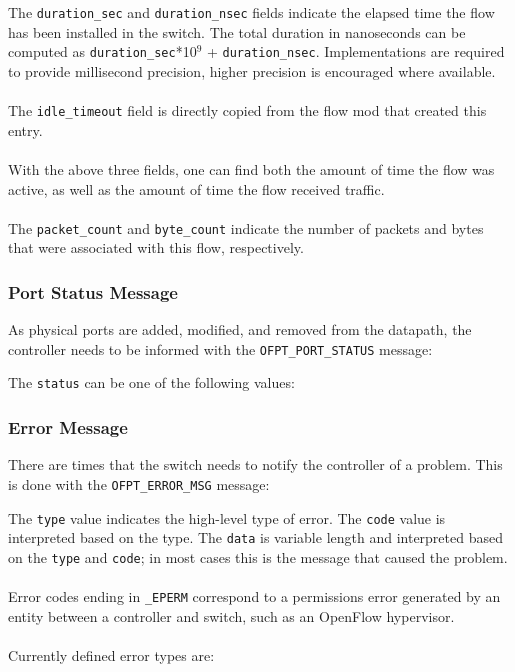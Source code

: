 
The \verb|duration_sec| and \verb|duration_nsec| fields indicate the elapsed time the flow has been installed in the switch. The total duration in nanoseconds can be computed as \verb|duration_sec|*10$^{9}$ + \verb|duration_nsec|. Implementations are required to provide millisecond precision, higher precision is encouraged where available.
\\\\
The \verb|idle_timeout| field is directly copied from the flow mod that created this entry. 
\\\\
With the above three fields, one can find both the amount of time the flow was active, as well as the amount of time the flow received traffic.
\\\\
The \verb|packet_count| and \verb|byte_count| indicate the number of packets and bytes that were associated with this flow, respectively. 
 
\subsubsection{Port Status Message}
As physical ports are added, modified, and removed from the datapath, the controller needs to be informed with the \verb|OFPT_PORT_STATUS| message:


The \verb|status| can be one of the following values:

 

\subsubsection{Error Message}
There are times that the switch needs to notify the controller of a problem.  This is done with the \verb|OFPT_ERROR_MSG| message: 	


The \verb|type| value indicates the high-level type of error.  The \verb|code| value is interpreted based on the type.  The \verb|data| is variable length and interpreted based on the \verb|type| and \verb|code|; in most cases this is the message that caused the problem.  
\\\\
Error codes ending in \verb|_EPERM| correspond to a permissions error generated by an entity between a controller and switch, such as an OpenFlow hypervisor. 
\\\\
Currently defined error types are:

